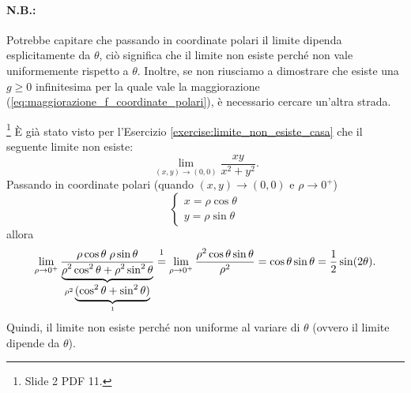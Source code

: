 \paragraph{N.B.:} Potrebbe capitare che passando in coordinate polari il limite dipenda esplicitamente da $\theta$, ciò significa che il limite non esiste perché non vale uniformemente rispetto a $\theta$. Inoltre, se non riusciamo a dimostrare che esiste una $g\geq 0$ infinitesima per la quale vale la maggiorazione (\ref{eq:maggiorazione_f_coordinate_polari}), è necessario cercare un'altra strada.

\begin{example}\footnote{Slide 2 PDF 11.}
    È già stato visto per l'Esercizio \ref{exercise:limite_non_esiste_casa} che il seguente limite non esiste:
    \begin{equation*}
        \lim_{(x,y)\rightarrow(0,0)}\frac{xy}{x^2+y^2}.
    \end{equation*}
    Passando in coordinate polari (quando $(x,y)\rightarrow(0,0)$ e $\rho\rightarrow 0^+$)
    \begin{equation*}
        \begin{cases}
            x=\rho\cos\theta\\
            y=\rho\sin\theta
        \end{cases}
    \end{equation*}
    allora 
    \begin{equation*}
        \lim_{\rho\rightarrow 0^+}\frac{\rho\cos\theta\;\rho\sin\theta}{\underbrace{\rho^2\cos^2\theta+\rho^2\sin^2\theta}_{\rho^2\underbrace{(\cos^2\theta+\sin^2\theta)}_{1}}}\overset{\footnotemark}{=}\lim_{\rho\rightarrow 0^+}\frac{\rho^2\cos\theta\sin\theta}{\rho^2}=\cos\theta\sin\theta=\frac{1}{2}\sin(2\theta).
    \end{equation*}
    Quindi, il limite non esiste perché non uniforme al variare di $\theta$ (ovvero il limite dipende da $\theta$).
\end{example}

